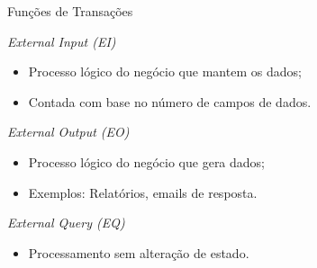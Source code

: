\begin{frame}{Funções de Transações}\small
\begin{description}[<+->]
  \item[Entrada Externa (EE):] {\em External Input (EI)}
    \begin{itemize}
    \item Processo lógico do negócio que mantem os dados;
    \item Contada com base no número de campos de dados.
    \end{itemize}

  \item[Saída Externa (SE):] {\em External Output (EO)}
    \begin{itemize}
    \item Processo lógico do negócio que gera dados;
    \item Exemplos: Relatórios, emails de resposta.
    \end{itemize}

  \item[Consulta Externa (CE):] {\em External Query (EQ)}
    \begin{itemize}
    \item Processamento sem alteração de estado.
    \end{itemize}
  \end{description}
\end{frame}

